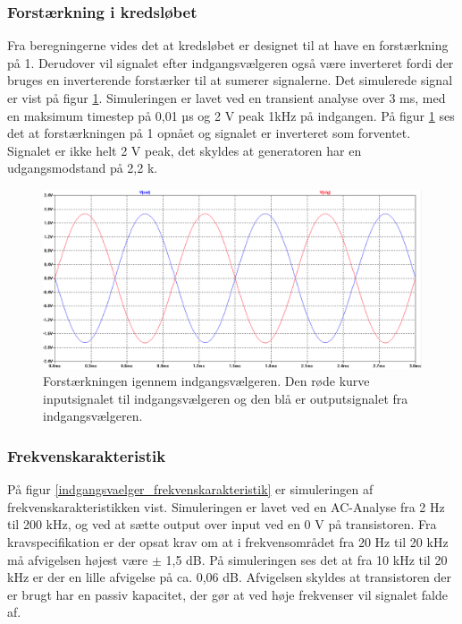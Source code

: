 \subsubsection*{Forstærkning i kredsløbet}
Fra beregningerne vides det at kredsløbet er designet til at have en forstærkning på 1. Derudover vil signalet efter indgangsvælgeren også være inverteret fordi der bruges en inverterende forstærker til at sumerer signalerne. Det simulerede signal er vist på figur \ref{indgangsvaelger_input/output}. Simuleringen er lavet ved en transient analyse over 3 ms, med en maksimum timestep på 0,01 µs og 2 V peak 1kHz på indgangen. På figur \ref{indgangsvaelger_input/output} ses det at forstærkningen på 1 opnået og signalet er inverteret som forventet. Signalet er ikke helt 2 V peak, det skyldes at generatoren har en udgangsmodstand på 2,2 k\ohm.
\begin{figure}[h]
\centering
\includegraphics[width=\textwidth]{teknisk/indgangsvaelger/simulering/input_output.png}
\caption{Forstærkningen igennem indgangsvælgeren. Den røde kurve inputsignalet til indgangsvælgeren og den blå er outputsignalet fra indgangsvælgeren.}
\label{indgangsvaelger_input/output}
\end{figure}

\subsubsection*{Frekvenskarakteristik}
På figur \ref{indgangsvaelger_frekvenskarakteristik} er simuleringen af frekvenskarakteristikken vist. Simuleringen er lavet ved en AC-Analyse fra 2 Hz til 200 kHz, og ved at sætte output over input ved en 0 V på transistoren. Fra kravspecifikation er der opsat krav om at i frekvensområdet fra 20 Hz til 20 kHz må afvigelsen højest være $\pm$ 1,5 dB. På simuleringen ses det at fra 10 kHz til 20 kHz er der en lille afvigelse på ca. 0,06 dB. Afvigelsen skyldes at transistoren der er brugt har en passiv kapacitet, der gør at ved høje frekvenser vil signalet falde af.

